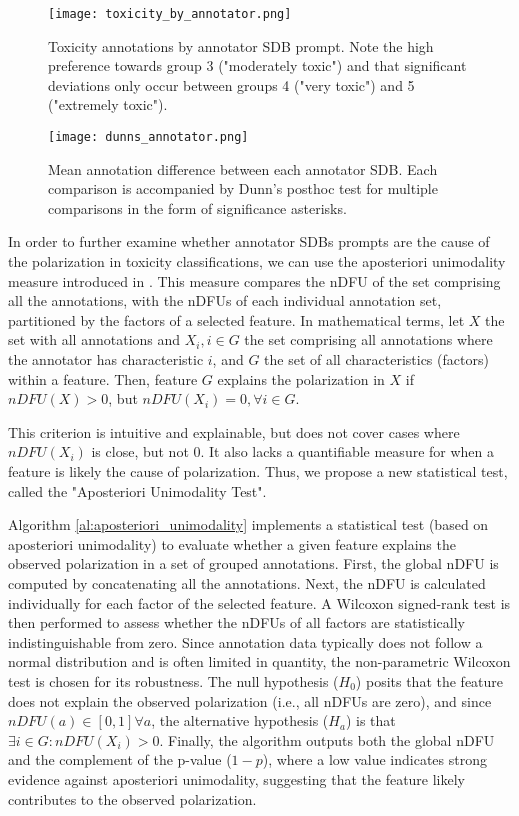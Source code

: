 \begin{figure}
	\centering
	\texttt{[image: toxicity\_by\_annotator.png]}
	\caption{Toxicity annotations by annotator \ac{SDB} prompt. Note the high preference towards group 3 ("moderately toxic") and that significant deviations only occur between groups 4 ("very toxic") and 5 ("extremely toxic").}
	\label{fig::toxicity-annotator}
\end{figure}

\begin{figure}
	\centering
	\texttt{[image: dunns\_annotator.png]}
	\caption{Mean annotation difference between each annotator \ac{SDB}. Each comparison is accompanied by Dunn's posthoc test for multiple comparisons in the form of significance asterisks.}
	\label{fig::toxicity-annotator-significance}
\end{figure}

In order to further examine whether annotator \acp{SDB} prompts are the cause of the polarization in toxicity classifications, we can use the aposteriori unimodality measure introduced in \citet{pavlopoulos-likas-2024-polarized}. This measure compares the \ac{nDFU} of the set comprising all the annotations, with the \acp{nDFU} of each individual annotation set, partitioned by the factors of a selected feature. In mathematical terms, let $X$ the set with all annotations and $X_i, i \in G$ the set comprising all annotations where the annotator has characteristic $i$, and $G$ the set of all characteristics (factors) within a feature. Then, feature $G$ explains the polarization in $X$ if $nDFU(X) > 0$, but $nDFU(X_i) = 0, \forall i \in G$. 

This criterion is intuitive and explainable, but does not cover cases where $nDFU(X_i)$ is close, but not $0$. It also lacks a quantifiable measure for when a feature is likely the cause of polarization. Thus, we propose a new statistical test, called the "Aposteriori Unimodality Test". 

Algorithm \ref{al:aposteriori_unimodality} implements a statistical test (based on aposteriori unimodality) to evaluate whether a given feature explains the observed polarization in a set of grouped annotations. First, the global \ac{nDFU} is computed by concatenating all the annotations. Next, the \ac{nDFU} is calculated individually for each factor of the selected feature. A Wilcoxon signed-rank test is then performed to assess whether the \acp{nDFU} of all factors are statistically indistinguishable from zero. Since annotation data typically does not follow a normal distribution and is often limited in quantity, the non-parametric Wilcoxon test is chosen for its robustness. The null hypothesis ($H_0$) posits that the feature does not explain the observed polarization (i.e., all \acp{nDFU} are zero), and since $nDFU(a) \in [0,1] \forall a$, the alternative hypothesis ($H_a$) is that $\exists i \in G: nDFU(X_i) > 0$. Finally, the algorithm outputs both the global \ac{nDFU} and the complement of the p-value ($1 - p$), where a low value indicates strong evidence against aposteriori unimodality, suggesting that the feature likely contributes to the observed polarization.

